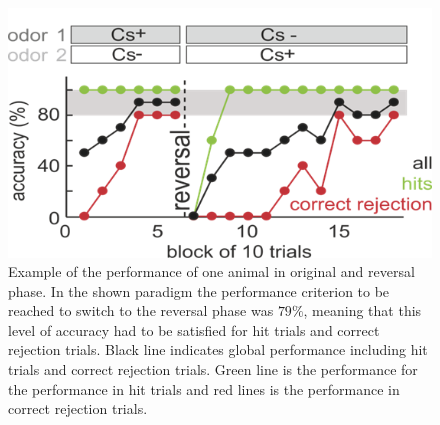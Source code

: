 \begin{figure}[H]
    \centering
\includegraphics[scale=0.8]{figures/Performance.png}
\caption{Example of the performance of one animal in original and reversal phase. In the shown paradigm the performance criterion to be reached to switch to the reversal phase was $79\%$, meaning that this level of accuracy had to be satisfied for hit trials and correct rejection trials. Black line indicates global performance including hit trials and correct rejection trials. Green line is the performance for the performance in hit trials and red lines is the performance in correct rejection trials.}
\label{fig:performance}
\end{figure}
